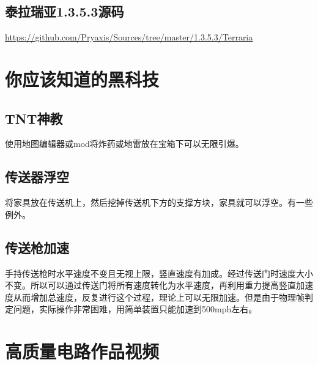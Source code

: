 \section{泰拉瑞亚1.3.5.3源码}\label{app8}
\url{https://github.com/Pryaxis/Sources/tree/master/1.3.5.3/Terraria}

\chapter{你应该知道的黑科技}
\section{TNT神教}使用地图编辑器或mod将炸药或地雷放在宝箱下可以无限引爆。
\section{传送器浮空}将家具放在传送机上，然后挖掉传送机下方的支撑方块，家具就可以浮空。有一些例外。
\section{传送枪加速}手持传送枪时水平速度不变且无视上限，竖直速度有加成。经过传送门时速度大小不变。所以可以通过传送门将所有速度转化为水平速度，再利用重力提高竖直加速度从而增加总速度，反复进行这个过程，理论上可以无限加速。但是由于物理帧判定问题，实际操作非常困难，用简单装置只能加速到500mph左右。

\chapter{高质量电路作品视频}

